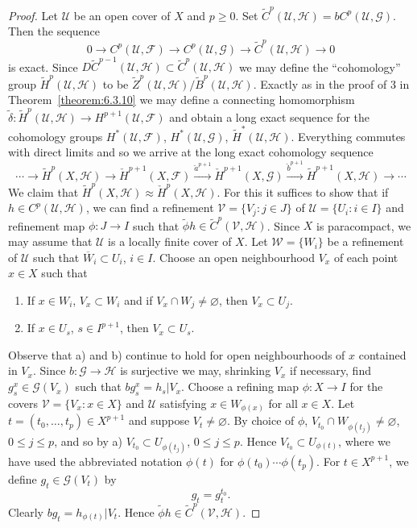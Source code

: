 \begin{proof}
Let $\mathcal U$ be an open cover of $X$ and $p\geq0$. Set $\widetilde C^p(\mathcal U,\mathcal H)=bC^p(\mathcal U,\mathcal G)$. Then the sequence
\[
0\to C^p(\mathcal U,\mathcal F)\to C^p(\mathcal U,\mathcal G)\to\widetilde C^p(\mathcal U,\mathcal H)\to0
\]
is exact. Since $D\widetilde C^{p-1}(\mathcal U,\mathcal H)\subset\widetilde C^p(\mathcal U,\mathcal H)$ we may define the ``cohomology'' group $\widetilde H^p(\mathcal U,\mathcal H)$ to be $\widetilde Z^p(\mathcal U,\mathcal H)/\widetilde B^p(\mathcal U,\mathcal H)$. Exactly as in the proof of 3 in Theorem~\ref{theorem:6.3.10} we may define a connecting homomorphism $\widetilde\delta:\widetilde H^p(\mathcal U,\mathcal H)\to H^{p+1}(\mathcal U,\mathcal F)$ and obtain a long exact sequence for the cohomology groups $H^*(\mathcal U,\mathcal F)$, $H^*(\mathcal U,\mathcal G)$, $\widetilde H^*(\mathcal U,\mathcal H)$. Everything commutes with direct limits and so we arrive at the long exact cohomology sequence
\[
\cdots\to\widetilde H^p(X,\mathcal H)\to\check H^{p+1}(X,\mathcal F)\xrightarrow{\check a^{p+1}}\check H^{p+1}(X,\mathcal G)\xrightarrow{\check b^{p+1}}\widetilde H^{p+1}(X,\mathcal H)\to\cdots
\]
We claim that $\widetilde H^p(X,\mathcal H)\approx\check H^p(X,\mathcal H)$. For this it suffices to show that if $h\in C^p(\mathcal U,\mathcal H)$, we can find a refinement $\mathcal V=\{V_j:j\in J\}$ of $\mathcal U=\{U_i:i\in I\}$ and refinement map $\phi:J\to I$ such that $\widetilde\phi h\in\widetilde C^p(\mathcal V,\mathcal H)$. Since $X$ is paracompact, we may assume that $\mathcal U$ is a locally finite cover of $X$. Let $\mathcal W=\{W_i\}$ be a refinement of $\mathcal U$ such that $\overline W_i\subset U_i$, $i\in I$. Choose an open neighbourhood $V_x$ of each point $x\in X$ such that
\begin{enumerate}[label=\alph*)]
\item If $x\in W_i$, $V_x\subset W_i$ and if $V_x\cap W_j\neq\varnothing$, then $V_x\subset U_j$.
\item If $x\in U_s$, $s\in I^{p+1}$, then $V_x\subset U_s$.
\end{enumerate}
Observe that a) and b) continue to hold for open neighbourhoods of $x$ contained in $V_x$. Since $b:\mathcal G\to\mathcal H$ is surjective we may, shrinking $V_x$ if necessary, find $g_s^x\in\mathcal G(V_x)$ such that $bg_s^x=h_s|V_x$. Choose a refining map $\phi:X\to I$ for the covers $\mathcal V=\{V_x:x\in X\}$ and $\mathcal U$ satisfying $x\in W_{\phi(x)}$ for all $x\in X$. Let $t=(t_0,\ldots,t_p)\in X^{p+1}$ and suppose $V_t\neq\varnothing$. By choice of $\phi$, $V_{t_0}\cap W_{\phi(t_j)}\neq\varnothing$, $0\leq j\leq p$, and so by a) $V_{t_0}\subset U_{\phi(t_j)}$, $0\leq j\leq p$. Hence $V_{t_0}\subset U_{\phi(t)}$, where we have used the abbreviated notation $\phi(t)$ for $\phi(t_0)\cdots\phi(t_p)$. For $t\in X^{p+1}$, we define $g_t\in\mathcal G(V_t)$ by
\[
g_t=g_t^{t_0}.
\]
Clearly $bg_t=h_{\phi(t)}|V_t$. Hence $\widetilde\phi h\in\widetilde C^p(\mathcal V,\mathcal H)$.


\end{proof}
